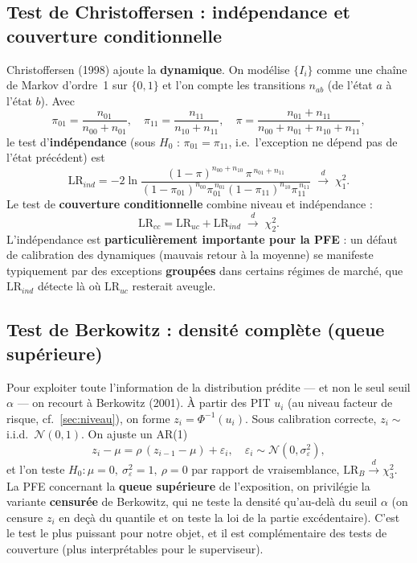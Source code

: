 \documentclass[11pt,a4paper]{article}
\newcommand{\LRuc}{\mathrm{LR}_{uc}}
\newcommand{\LRind}{\mathrm{LR}_{ind}}
\newcommand{\LRcc}{\mathrm{LR}_{cc}}
\newcommand{\LRB}{\mathrm{LR}_{B}}
\theoremstyle{remark}
\begin{document}
\subsection{Test de Christoffersen : indépendance et couverture conditionnelle}

Christoffersen (1998) ajoute la \textbf{dynamique}. On modélise $\{I_i\}$ comme une chaîne de Markov d'ordre~1 sur $\{0,1\}$ et l'on compte les transitions $n_{ab}$ (de l'état $a$ à l'état $b$). Avec
\begin{equation}
\pi_{01} = \frac{n_{01}}{n_{00}+n_{01}}, \quad \pi_{11} = \frac{n_{11}}{n_{10}+n_{11}}, \quad \pi = \frac{n_{01}+n_{11}}{n_{00}+n_{01}+n_{10}+n_{11}},
\end{equation}
le test d'\textbf{indépendance} (sous $H_0$ : $\pi_{01} = \pi_{11}$, i.e.\ l'exception ne dépend pas de l'état précédent) est
\begin{equation}
\LRind = -2\ln\!\frac{(1-\pi)^{n_{00}+n_{10}}\,\pi^{\,n_{01}+n_{11}}}{(1-\pi_{01})^{n_{00}}\pi_{01}^{\,n_{01}}(1-\pi_{11})^{n_{10}}\pi_{11}^{\,n_{11}}} \;\xrightarrow{d}\; \chi^2_1.
\end{equation}
Le test de \textbf{couverture conditionnelle} combine niveau et indépendance :
\begin{equation}
\boxed{\;\LRcc = \LRuc + \LRind \;\xrightarrow{d}\; \chi^2_2.\;}
\end{equation}
L'indépendance est \textbf{particulièrement importante pour la PFE} : un défaut de calibration des dynamiques (mauvais retour à la moyenne) se manifeste typiquement par des exceptions \textbf{groupées} dans certains régimes de marché, que $\LRind$ détecte là où $\LRuc$ resterait aveugle.

\subsection{Test de Berkowitz : densité complète (queue supérieure)}

Pour exploiter toute l'information de la distribution prédite --- et non le seul seuil $\alpha$ --- on recourt à Berkowitz (2001). À partir des PIT $u_i$ (au niveau facteur de risque, cf.\ \ref{sec:niveau}), on forme $z_i = \Phi^{-1}(u_i)$. Sous calibration correcte, $z_i \sim$ i.i.d.\ $\mathcal{N}(0,1)$. On ajuste un AR(1)
\begin{equation}
z_i - \mu = \rho\,(z_{i-1} - \mu) + \varepsilon_i, \quad \varepsilon_i \sim \mathcal{N}(0, \sigma_\varepsilon^2),
\end{equation}
et l'on teste $H_0: \mu = 0,\ \sigma_\varepsilon^2 = 1,\ \rho = 0$ par rapport de vraisemblance, $\LRB \xrightarrow{d} \chi^2_3$. La PFE concernant la \textbf{queue supérieure} de l'exposition, on privilégie la variante \textbf{censurée} de Berkowitz, qui ne teste la densité qu'au-delà du seuil $\alpha$ (on censure $z_i$ en deçà du quantile et on teste la loi de la partie excédentaire). C'est le test le plus puissant pour notre objet, et il est complémentaire des tests de couverture (plus interprétables pour le superviseur).
\end{document}
